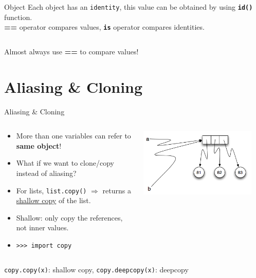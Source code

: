     \begin{frame}{Object}
        \LARGE
        Each object has an \texttt{identity},
        \pause
         this value can be obtained by using \texttt{\textbf{id()}} function.\\
        \pause
        \textbf{==} operator compares values, \textbf{\texttt{is}} operator compares identities. 
        \pause
        \inputminted[frame=single,framesep=2pt]{python3}{code-examples/identity.py}
        \pause
        Almost always use \textbf{==} to compare values!
    \end{frame}

    \section{Aliasing \& Cloning}
    \begin{frame}{Aliasing \& Cloning}
        \Large
        \begin{columns}
            \begin{column}[c]{0.6\textwidth}
                \begin{itemize}
                    \item More than one variables can refer to \textbf{same object}!
                    \item What if we want to clone/copy instead of aliasing?
                    \item For lists, \texttt{list.copy()} $\Rightarrow$ returns a \underline{shallow copy} of the list.
                    \item Shallow: only copy the references, not inner values.
                    \item \texttt{>>> import copy}
                \end{itemize}
            \end{column}
            \begin{column}[c]{0.4\textwidth}
                \includegraphics[width=0.9\textwidth]{images/aliasing.png}
            \end{column}
        \end{columns}
        \texttt{copy.copy(x)}: shallow copy, \texttt{copy.deepcopy(x)}: deepcopy   
    \end{frame}



